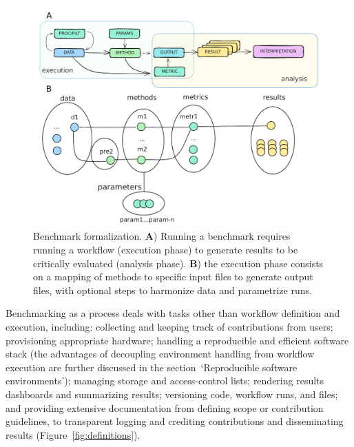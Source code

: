 \documentclass[11pt]{article}
\begin{document}
\begin{figure}
    \centering
    \includegraphics[width=0.75\linewidth]{./figures/fig3_bens_formalization_arrows.pdf} %
    \caption[Benchmark formalization.]{Benchmark formalization. \textbf{A}) Running a benchmark requires running a workflow (execution phase) to generate results to be critically evaluated (analysis phase). \textbf{B}) the execution phase consists on a mapping of methods to specific input files to generate output files, with optional steps to harmonize data and parametrize runs.}
    \label{fig:formalization}
\end{figure}

Benchmarking as a process deals with tasks other than workflow definition and execution, including: collecting and keeping track of contributions from users; provisioning appropriate hardware; handling a reproducible and efficient software stack (the advantages of decoupling environment handling from workflow execution are further discussed in the section~`Reproducible software environments'); managing storage and access-control lists; rendering results dashboards and summarizing results; versioning code, workflow runs, and files; and providing extensive documentation from defining scope or contribution guidelines, to transparent logging and crediting contributions and disseminating results (Figure~\ref{fig:definitions}).
\end{document}
